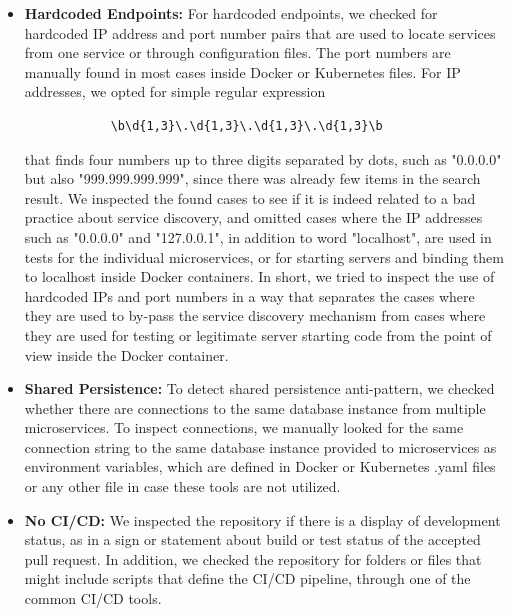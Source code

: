 \documentclass{Configuration_Files/PoliMi3i_thesis}
\begin{document}
\begin{itemize}
\begin{itemize}
        \item \textbf{Hardcoded Endpoints:} For hardcoded endpoints, we checked for hardcoded IP address and port number pairs that are used to locate services from one service or through configuration files.
        The port numbers are manually found in most cases inside Docker or Kubernetes files.
        For IP addresses, we opted for simple regular expression \begin{verbatim}
            \b\d{1,3}\.\d{1,3}\.\d{1,3}\.\d{1,3}\b
        \end{verbatim}
        that finds four numbers up to three digits separated by dots, such as "0.0.0.0" but also "999.999.999.999", since there was already few items in the search result.
        We inspected the found cases to see if it is indeed related to a bad practice about service discovery, and omitted cases where the IP addresses such as "0.0.0.0" and "127.0.0.1", in addition to word "localhost", are used in tests for the individual microservices, or for starting servers and binding them to localhost inside Docker containers.
        In short, we tried to inspect the use of hardcoded IPs and port numbers in a way that separates the cases where they are used to by-pass the service discovery mechanism from cases where they are used for testing or legitimate server starting code from the point of view inside the Docker container.
        
        \item \textbf{Shared Persistence:} To detect shared persistence anti-pattern, we checked whether there are connections to the same database instance from multiple microservices.
        To inspect connections, we manually looked for the same connection string to the same database instance provided to microservices as environment variables, which are defined in Docker or Kubernetes .yaml files or any other file in case these tools are not utilized.
        
        \item \textbf{No CI/CD:} We inspected the repository if there is a display of development status, as in a sign or statement about build or test status of the accepted pull request.
        In addition, we checked the repository for folders or files that might include scripts that define the CI/CD pipeline, through one of the common CI/CD tools.
        

\end{itemize}
\end{itemize}
\end{document}
